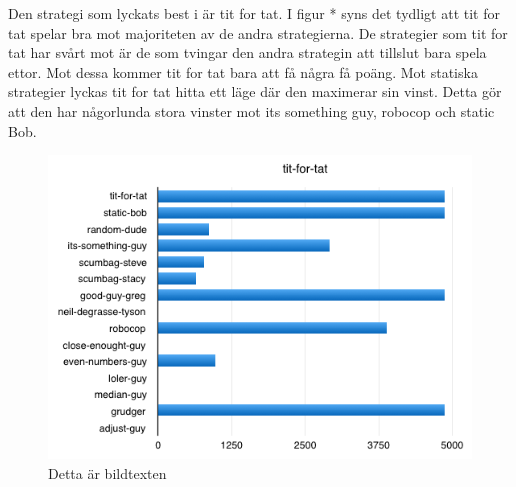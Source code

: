 Den strategi som lyckats best i är tit for tat. I figur * syns det tydligt att tit for tat spelar bra mot majoriteten av de andra strategierna. De strategier som tit for tat har svårt mot är de som tvingar den andra strategin att tillslut bara spela ettor. Mot dessa kommer tit for tat bara att få några få poäng. Mot statiska strategier lyckas tit for tat hitta ett läge där den maximerar sin vinst. Detta gör att den har någorlunda stora vinster mot its something guy, robocop och static Bob.

\begin{figure}[htb]
	\begin{center}
	\includegraphics[scale=0.75, angle=0]{bilder/tit-for-tat.png}
	\caption{Detta är bildtexten}
	\label{tit-for-tat}
	\end{center}
\end{figure}

